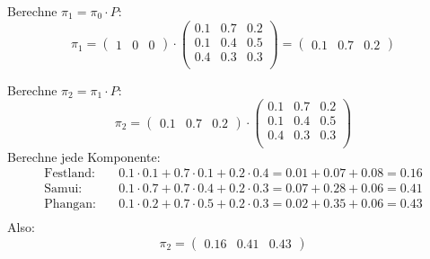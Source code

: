 \begin{mychallenge}
\begin{myanswer}
        Berechne $\pi_1 = \pi_0 \cdot P$:
        \[
            \pi_1 = \begin{pmatrix} 1 & 0 & 0 \end{pmatrix}
            \cdot
            \begin{pmatrix}
                0.1 & 0.7 & 0.2 \\
                0.1 & 0.4 & 0.5 \\
                0.4 & 0.3 & 0.3 \\
            \end{pmatrix}
            = \begin{pmatrix} 0.1 & 0.7 & 0.2 \end{pmatrix}
        \]

        Berechne $\pi_2 = \pi_1 \cdot P$:
        \[
            \pi_2 = \begin{pmatrix} 0.1 & 0.7 & 0.2 \end{pmatrix}
            \cdot
            \begin{pmatrix}
                0.1 & 0.7 & 0.2 \\
                0.1 & 0.4 & 0.5 \\
                0.4 & 0.3 & 0.3 \\
            \end{pmatrix}
        \]
        Berechne jede Komponente:
        \begin{align*}
            \text{Festland:} & \quad 0.1 \cdot 0.1 + 0.7 \cdot 0.1 + 0.2 \cdot 0.4 = 0.01 + 0.07 + 0.08 = 0.16 \\
            \text{Samui:}    & \quad 0.1 \cdot 0.7 + 0.7 \cdot 0.4 + 0.2 \cdot 0.3 = 0.07 + 0.28 + 0.06 = 0.41 \\
            \text{Phangan:}  & \quad 0.1 \cdot 0.2 + 0.7 \cdot 0.5 + 0.2 \cdot 0.3 = 0.02 + 0.35 + 0.06 = 0.43 \\
        \end{align*}
        Also:
        \[
            \pi_2 = \begin{pmatrix} 0.16 & 0.41 & 0.43 \end{pmatrix}
        \]


\end{myanswer}
\end{mychallenge}
